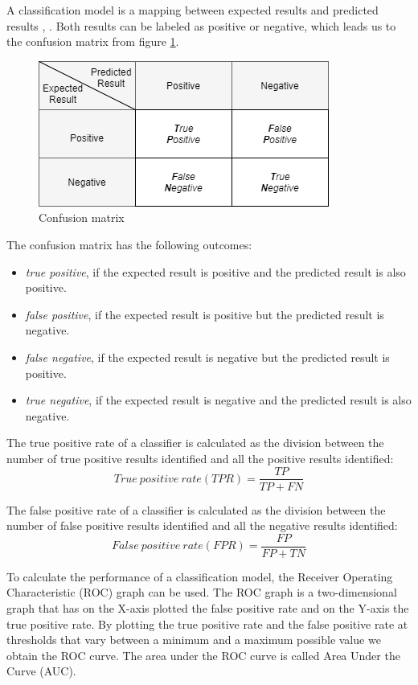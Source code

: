 \documentclass[12pt]{mitthesis}
\begin{document}
A classification model is a mapping between expected results and predicted results \cite{ROCIntro}, \cite{ROCBRADLEY19971145}. Both results can be labeled as positive or negative, which leads us to the confusion matrix from figure \ref{fig:confusion}. 

\begin{figure}[h]
\centering
\includegraphics[scale=0.9]{confusion.png}
\caption{Confusion matrix}
\label{fig:confusion}
\centering
\end{figure}

The confusion matrix has the following outcomes:
		\begin{itemize}
			\item \textit{true positive}, if the expected result is positive and the predicted result is also positive.
			\item \textit{false positive}, if the expected result is positive but the predicted result is negative.
			\item \textit{false negative}, if the expected result is negative but the predicted result is positive.
			\item \textit{true negative}, if the expected result is negative and the predicted result is also negative.
		\end{itemize}

The true positive rate of a classifier is calculated as the division between the number of true positive results identified and all the positive results identified:
\[ True\ positive\ rate (TPR)
  = \dfrac{TP}{TP+FN}
\]

The false positive rate of a classifier is calculated as the division between the number of false positive results identified and all the negative results identified:
\[ False\ positive\ rate (FPR)
  = \dfrac{FP}{FP+TN}
\]

To calculate the performance of a classification model, the Receiver Operating Characteristic (ROC) graph can be used. The ROC graph is a two-dimensional graph that has on the X-axis plotted the false positive rate and on the Y-axis the true positive rate. By plotting the true positive rate and the false positive rate at thresholds that vary between a minimum and a maximum possible value we obtain the ROC curve. The area under the ROC curve is called Area Under the Curve (AUC).
\end{document}
